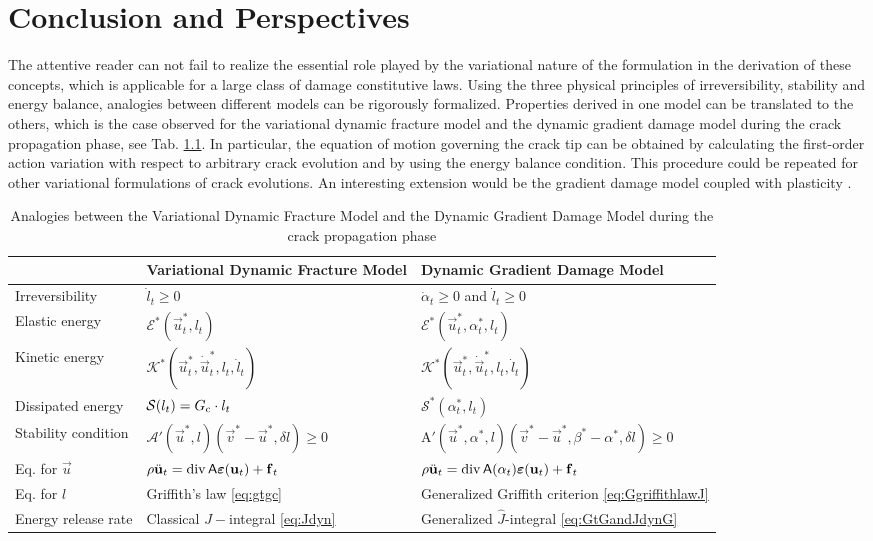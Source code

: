 \chapter{Conclusion and Perspectives} \label{chap:conclusion}

The attentive reader can not fail to realize the essential role played by the variational nature of the formulation in the derivation of these concepts, which is applicable for a large class of damage constitutive laws. Using the three physical principles of irreversibility, stability and energy balance, analogies between different models can be rigorously formalized. Properties derived in one model can be translated to the others, which is the case observed for the variational dynamic fracture model and the dynamic gradient damage model during the crack propagation phase, see Tab. \ref{tab:analogy}. In particular, the equation of motion governing the crack tip can be obtained by calculating the first-order action variation with respect to arbitrary crack evolution and by using the energy balance condition. This procedure could be repeated for other variational formulations of crack evolutions. An interesting extension would be the gradient damage model coupled with plasticity \cite{AlessiMarigoVidoli:2015}.
\begin{table}[htbp]
\caption{Analogies between the Variational Dynamic Fracture Model and the Dynamic Gradient Damage Model during the crack propagation phase} \label{tab:analogy}
\centering
\begin{tabular}{lll} \toprule
 & Variational Dynamic Fracture Model & Dynamic Gradient Damage Model \\ \midrule
Irreversibility & $\dot{l}_t\geq 0$ & $\dot{\alpha}_t\geq 0$ and $\dot{l}_t\geq 0$ \\
Elastic energy & $\mathcal{E}^*(\vec{u}^*_t,l_t)$ & $\mathcal{E}^*(\vec{u}^*_t,\alpha^*_t,l_t)$ \\
Kinetic energy & $\mathcal{K}^*(\vec{u}_t^*,\dot{\vec{u}}_t^*,l_t,\dot{l}_t)$ & $\mathcal{K}^*(\vec{u}_t^*,\dot{\vec{u}}_t^*,l_t,\dot{l}_t)$ \\
Dissipated energy & $\mathcal{S}(l_t)=G_\mathrm{c}\cdot l_t$ & $\mathcal{S}^*(\alpha^*_t,l_t)$ \\
Stability condition & $\mathcal{A}'(\vec{u}^*,l)(\vec{v}^*-\vec{u}^*,\delta l)\geq 0$ & $\mathrm{A}'(\vec{u}^*,\alpha^*,l)(\vec{v}^*-\vec{u}^*,\beta^*-\alpha^*,\delta l)\geq 0$ \\
Eq. for $\vec{u}$ & $\rho\ddot{\vec{u}}_t=\div\tens{A}\eps(\vec{u}_t)+\vec{f}_t$ & $\rho\ddot{\vec{u}}_t=\div\tens{A}(\alpha_t)\eps(\vec{u}_t)+\vec{f}_t$ \\
Eq. for $l$ & Griffith's law \eqref{eq:gtgc} & Generalized Griffith criterion \eqref{eq:GgriffithlawJ} \\
Energy release rate & Classical $J-$integral \eqref{eq:Jdyn} & Generalized $\widehat{J}$-integral \eqref{eq:GtGandJdynG} \\ \bottomrule
\end{tabular}
\end{table}

